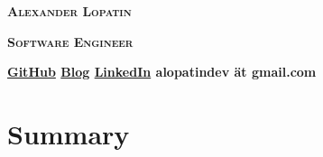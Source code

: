 \begin{center}
\fontsize{23pt}{15pt}\selectfont
\textsc{\lsstyle\bfseries Alexander Lopatin\mdseries}

\vspace{15pt}

\fontsize{18pt}{10pt}\selectfont
\textsc{\bfseries Software Engineer\mdseries}

\vspace{6pt}


\horizline

\vspace{0.1cm}

{
\bfseries
\fontsize{8pt}{8pt}\selectfont
\faGithub\hspace{0.1cm}\href{https://github.com/alopatindev?tab=repositories}{GitHub}
\contactDelimiter\faRss\hspace{0.1cm}\href{https://alopatindev.github.io}{Blog}
\contactDelimiter\faLinkedinSquare\hspace{0.1cm}\href{https://www.linkedin.com/in/AlexanderLopatin}{LinkedIn}
\contactDelimiter\faEnvelope\hspace{0.1cm}alopatindev ät gmail.com
\mdseries
}

\end{center}

\fontsize{11pt}{12.2pt}\selectfont

\section*{Summary}

